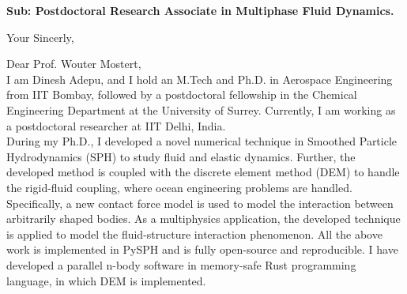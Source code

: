 \documentclass[11pt,a4paper,roman]{moderncv}
\begin{document}
\date{\today}
\opening{\textbf{Sub: Postdoctoral Research Associate in Multiphase Fluid Dynamics.}}
\closing{Your Sincerly, \vspace{-1em}}


\makelettertitle



Dear Prof. Wouter Mostert,
\\
\vspace{1em}
I am Dinesh Adepu, and I hold an M.Tech and Ph.D. in Aerospace
Engineering from IIT Bombay, followed by a postdoctoral fellowship in
the Chemical Engineering Department at the University of
Surrey. Currently, I am working as a postdoctoral researcher at IIT
Delhi, India. \\


\vspace{1em}
During my Ph.D., I developed a novel numerical technique in Smoothed
Particle Hydrodynamics (SPH) to study fluid and elastic dynamics.
Further, the developed method is coupled with the discrete element
method (DEM) to handle the rigid-fluid coupling, where ocean
engineering problems are handled.  Specifically, a new contact force
model is used to model the interaction between arbitrarily shaped
bodies. As a multiphysics application, the developed technique is
applied to model the fluid-structure interaction phenomenon. All the
above work is implemented in PySPH and is fully open-source and
reproducible. I have developed a parallel n-body software in
memory-safe Rust programming language, in which DEM is implemented. \\
\end{document}
